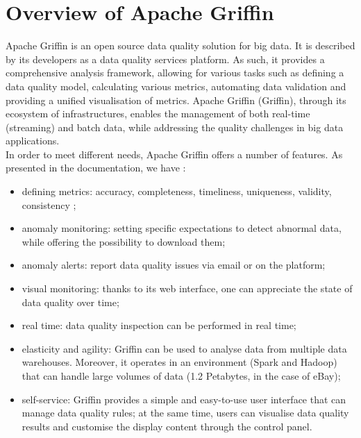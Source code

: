 \section{Overview of Apache Griffin}
Apache Griffin is an open source data quality solution for big data. It is described by its developers as a data quality services platform. As such, it provides a comprehensive analysis framework, allowing for various tasks such as defining a data quality model, calculating various metrics, automating data validation and providing a unified visualisation of metrics. Apache Griffin (Griffin), through its ecosystem of infrastructures, enables the management of both real-time (streaming) and batch data, while addressing the quality challenges in big data applications. \\

In order to meet different needs, Apache Griffin offers a number of features. As presented in the documentation, we have :
\begin{itemize}[parsep=0cm,itemsep=0cm]
    \item defining metrics: accuracy, completeness, timeliness, uniqueness, validity, consistency ;
    \item anomaly monitoring: setting specific expectations to detect abnormal data, while offering the possibility to download them;
    \item anomaly alerts: report data quality issues via email or on the platform;
    \item visual monitoring: thanks to its web interface, one can appreciate the state of data quality over time;
    \item real time: data quality inspection can be performed in real time;
    \item elasticity and agility:  Griffin can be used to analyse data from multiple data warehouses. Moreover, it operates in an environment (Spark and Hadoop) that can handle large volumes of data (1.2 Petabytes, in the case of eBay);
    \item self-service: Griffin provides a simple and easy-to-use user interface that can manage data quality rules; at the same time, users can visualise data quality results and customise the display content through the control panel.
\end{itemize}
